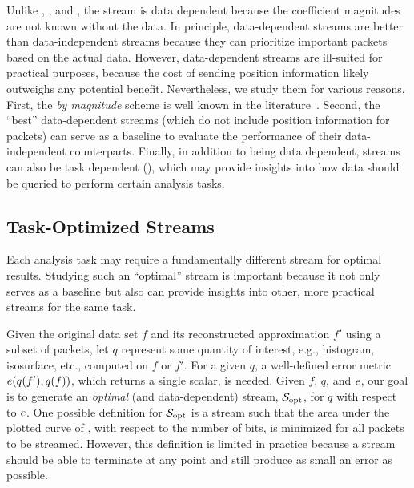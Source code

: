 Unlike \slvl, \sbit, and \swav, the \smag stream is data dependent because the coefficient
magnitudes are not known without the data.
%
In principle, data-dependent streams are better than data-independent streams because they can
prioritize important packets based on the actual data. However, data-dependent streams are
ill-suited for practical purposes, because the cost of sending position information likely outweighs
any potential benefit. Nevertheless, we study them for various reasons. First, the \emph{by
magnitude} scheme is well known in the literature~\cite{vapor2007}. Second, the ``best''
data-dependent streams (which do not include position information for packets) can serve as a
baseline to evaluate the performance of their data-independent counterparts. Finally, in addition to
being data dependent, streams can also be task dependent (), which may
provide insights into how data should be queried to perform certain analysis tasks.

\subsection{Task-Optimized Streams} \label{sec:data_dep_streams}

Each analysis task may require a fundamentally different stream for optimal results. Studying such
an ``optimal'' stream is important because it not only serves as a baseline but also can provide
insights into other, more practical streams for the same task.

Given the original data set $f$ and its reconstructed approximation $f'$ using a subset of packets,
let $q$ represent some quantity of interest, e.g., histogram, isosurface, etc., computed on $f$ or
$f'$. For a given $q$, a well-defined error metric $e(q(f'),q(f))$, which returns a single
scalar, is needed. Given $f$, $q$, and $e$, our goal is to generate an \emph{optimal} (and
data-dependent) stream, $\sopt$, for $q$ with respect to $e$. One possible definition for $\sopt$
is a stream such that the area under the plotted curve of \err, with respect to the number of bits,
is minimized for all packets to be streamed. However, this definition is limited in practice because
a stream should be able to terminate at any point and still produce as small an error as possible.

